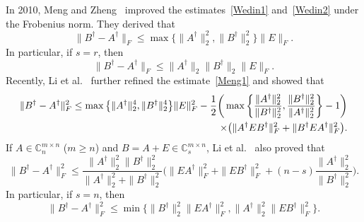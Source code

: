 \documentclass[11pt]{article}
\begin{document}
In 2010, Meng and Zheng~\cite[Theorems 2.1 and 2.2]{Meng2010} improved the estimates~\eqref{Wedin1} and~\eqref{Wedin2} under the Frobenius norm. They derived that
\begin{equation}\label{Meng1}
\|B^{\dagger}-A^{\dagger}\|_{F}\leq\max\big\{\|A^{\dagger}\|_{2}^{2},\|B^{\dagger}\|_{2}^{2}\big\}\|E\|_{F}.
\end{equation}
In particular, if $s=r$, then
\begin{equation}\label{Meng2}
\|B^{\dagger}-A^{\dagger}\|_{F}\leq\|A^{\dagger}\|_{2}\|B^{\dagger}\|_{2}\|E\|_{F}.
\end{equation}
Recently, Li et al.~\cite[Theorem 3.1]{Li2018} further refined the estimate~\eqref{Meng1} and showed that
\begin{align}
\|B^{\dagger}-A^{\dagger}\|_{F}^{2}\leq\max\big\{\|A^{\dagger}\|_{2}^{4},\|B^{\dagger}\|_{2}^{4}\big\}\|E\|_{F}^{2}-\frac{1}{2}\bigg(\max\bigg\{\frac{\|A^{\dagger}\|_{2}^{2}}{\|B^{\dagger}\|_{2}^{2}},\frac{\|B^{\dagger}\|_{2}^{2}}{\|A^{\dagger}\|_{2}^{2}}\bigg\}-1\bigg)&\notag\\
\times\big(\|A^{\dagger}EB^{\dagger}\|_{F}^{2}+\|B^{\dagger}EA^{\dagger}\|_{F}^{2}\big).&\label{Li1}
\end{align}
If $A\in\mathbb{C}^{m\times n}_{n}$ ($m\geq n$) and $B=A+E\in\mathbb{C}^{m\times n}_{s}$, Li et al.~\cite[Theorem 3.2]{Li2018} also proved that
\begin{equation}\label{Li2.1}
\|B^{\dagger}-A^{\dagger}\|_{F}^{2}\leq\frac{\|A^{\dagger}\|_{2}^{2}\|B^{\dagger}\|_{2}^{2}}{\|A^{\dagger}\|_{2}^{2}+\|B^{\dagger}\|_{2}^{2}}\bigg(\|EA^{\dagger}\|_{F}^{2}+\|EB^{\dagger}\|_{F}^{2}+(n-s)\frac{\|A^{\dagger}\|_{2}^{2}}{\|B^{\dagger}\|_{2}^{2}}\bigg).
\end{equation}
In particular, if $s=n$, then
\begin{equation}\label{Li2.2}
\|B^{\dagger}-A^{\dagger}\|_{F}^{2}\leq\min\big\{\|B^{\dagger}\|_{2}^{2}\|EA^{\dagger}\|_{F}^{2},\|A^{\dagger}\|_{2}^{2}\|EB^{\dagger}\|_{F}^{2}\big\}.
\end{equation}
\end{document}
